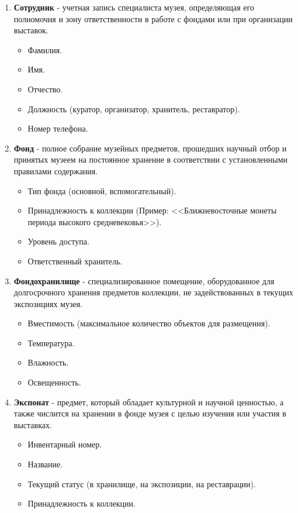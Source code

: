 \begin{enumerate}
    \item \textbf{Сотрудник} - учетная запись специалиста музея, определяющая его полномочия и зону ответственности в работе с фондами или при организации выставок.
    \begin{itemize}
        \item Фамилия.
        \item Имя.
        \item Отчество.
        \item Должность (куратор, организатор, хранитель, реставратор).
        \item Номер телефона.
    \end{itemize}

    \item \textbf{Фонд} - полное собрание музейных предметов, прошедших научный отбор и принятых музеем на постоянное хранение в соответствии с установленными правилами содержания.
    \begin{itemize}
        \item Тип фонда (основной, вспомогательный).
        \item Принадлежность к коллекции (Пример: <<Ближневосточные монеты периода высокого средневековья>>).
        \item Уровень доступа.
        \item Ответственный хранитель.
    \end{itemize}

    \item \textbf{Фондохранилище} - специализированное помещение, оборудованное для долгосрочного хранения предметов коллекции, не задействованных в текущих экспозициях музея.
    \begin{itemize}
        \item Вместимость (максимальное количество объектов для размещения).
        \item Температура.
        \item Влажность.
        \item Освещенность.
    \end{itemize}

    \item \textbf{Экспонат} - предмет, который обладает культурной и научной ценностью, а также числится на хранении в фонде музея с целью изучения или участия в выставках. 
    \begin{itemize}
        \item Инвентарный номер.
        \item Название.
        \item Текущий статус (в хранилище, на экспозиции, на реставрации).
        \item Принадлежность к коллекции.
    \end{itemize}


\end{enumerate}
